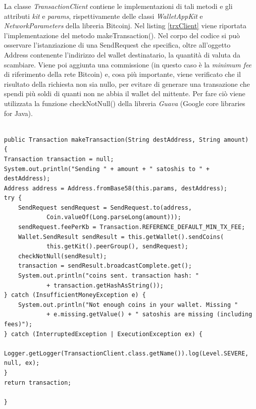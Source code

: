 La classe \textit{TransactionClient} contiene le implementazioni di tali metodi e gli attributi \textit{kit} e \textit{params}, rispettivamente delle classi \textit{WalletAppKit} e \textit{NetworkParameters} della libreria Bitcoinj. Nel listing \ref{trxClient} viene riportata l'implementazione del metodo makeTransaction(). Nel corpo del codice si può osservare l'istanziazione di una SendRequest che specifica, oltre all'oggetto Address contenente l'indirizzo del wallet destinatario, la quantità di valuta da scambiare. Viene poi aggiunta una commissione (in questo caso è la \textit{minimum fee} di riferimento della rete Bitcoin) e, cosa più importante, viene verificato che il risultato della richiesta non sia nullo, per evitare di generare una transazione che spendi più soldi di quanti non ne abbia il wallet del mittente. Per fare ciò viene utilizzata la funzione checkNotNull() della libreria \textit{Guava} (Google core libraries for Java).

\begin{lstlisting}[caption={Metodo makeTransaction in TransactionClient.java},label={trxClient},style={c}]

public Transaction makeTransaction(String destAddress, String amount) 
{
Transaction transaction = null;
System.out.println("Sending " + amount + " satoshis to " + destAddress);
Address address = Address.fromBase58(this.params, destAddress);
try {
    SendRequest sendRequest = SendRequest.to(address,
            Coin.valueOf(Long.parseLong(amount)));
    sendRequest.feePerKb = Transaction.REFERENCE_DEFAULT_MIN_TX_FEE;
    Wallet.SendResult sendResult = this.getWallet().sendCoins(
            this.getKit().peerGroup(), sendRequest);
    checkNotNull(sendResult); 
    transaction = sendResult.broadcastComplete.get();
    System.out.println("coins sent. transaction hash: "
            + transaction.getHashAsString());
} catch (InsufficientMoneyException e) {
    System.out.println("Not enough coins in your wallet. Missing "
            + e.missing.getValue() + " satoshis are missing (including fees)");
} catch (InterruptedException | ExecutionException ex) {
    Logger.getLogger(TransactionClient.class.getName()).log(Level.SEVERE, null, ex);
}
return transaction;

}
\end{lstlisting}



